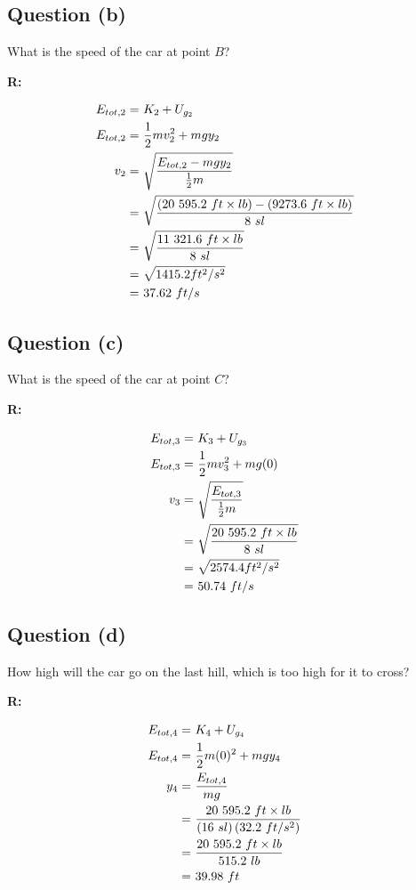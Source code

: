 	\subsection{Question (b)}

		What is the speed of the car at point $B$?

		\textbf{R:}

		\begin{align}
			E_{tot,2} = \ &K_{2} + U_{g_{2}}& \notag \\
			E_{tot,2} = \ &\frac{1}{2} mv_{2}^{2} + mgy_{2}& \notag \\
			v_{2} = \ &\sqrt{\frac{E_{tot,2} - mgy_{2}}{\frac{1}{2}m}}& \notag \\
			= \ &\sqrt{\frac{(20 \ 595.2 \ ft \times lb) - (9273.6 \ ft \times lb)}{8 \ sl}}& \notag \\
			= \ &\sqrt{\frac{11 \ 321.6 \ ft \times lb}{8 \ sl}}& \notag \\
			= \ &\sqrt{1415.2 ft^{2}/s^{2}}& \notag \\
			= \ &37.62 \ ft/s&
		\end{align}

	\subsection{Question (c)}

		What is the speed of the car at point $C$?

		\textbf{R:}

		\begin{align}
			E_{tot,3} = \ &K_{3} + U_{g_{3}}& \notag \\
			E_{tot,3} = \ &\frac{1}{2} mv_{3}^{2} + mg(0)& \notag \\
			v_{3} = \ &\sqrt{\frac{E_{tot,3}}{\frac{1}{2}m}}& \notag \\
			= \ &\sqrt{\frac{20 \ 595.2 \ ft \times lb}{8 \ sl}}& \notag \\
			= \ &\sqrt{2574.4 ft^{2}/s^{2}}& \notag \\
			= \ &50.74 \ ft/s&
		\end{align}

	\subsection{Question (d)}

		How high will the car go on the last hill, which is too high for it to cross?

		\textbf{R:}

		\begin{align}
			E_{tot,4} = \ &K_{4} + U_{g_{4}}& \notag \\
			E_{tot,4} = \ &\frac{1}{2} m(0)^{2} + mgy_{4}& \notag \\
			y_{4} = \ &\frac{E_{tot,4}}{mg}& \notag \\
			= \ &\frac{20 \ 595.2 \ ft \times lb}{(16 \ sl)\left(32.2 \ ft/s^{2}\right)}& \notag \\
			= \ &\frac{20 \ 595.2 \ ft \times lb}{515.2 \ lb}& \notag \\
			= \ &39.98 \ ft&
		\end{align}
